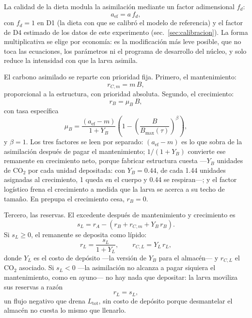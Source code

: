La calidad de la dieta modula la asimilación mediante un factor adimensional $f_d$:
\begin{equation}
  a_{\mathrm{ef}} = a\,f_d,
  \label{eq:aef}
\end{equation}
con $f_d = 1$ en D1 (la dieta con que se calibró el modelo de referencia) y el factor de D4 estimado de los datos de este experimento (sec.~\ref{sec:calibracion}). La forma multiplicativa se elige por economía: es la modificación más leve posible, que no toca las ecuaciones, los parámetros ni el programa de desarrollo del núcleo, y solo reduce la intensidad con que la larva asimila.

El carbono asimilado se reparte con prioridad fija. Primero, el mantenimiento:
\begin{equation}
  r_{C,m} = m\,B,
  \label{eq:mant}
\end{equation}
proporcional a la estructura, con prioridad absoluta. Segundo, el crecimiento:
\begin{equation}
  r_B = \mu_B\,B,
  \label{eq:crec}
\end{equation}
con tasa específica
\begin{equation}
  \mu_B = \frac{(a_{\mathrm{ef}} - m)}{1 + Y_B}\left(1 - \left(\frac{B}{B_{\max}(\tau)}\right)^{\beta}\right),
  \label{eq:muB}
\end{equation}
y $\beta = 1$. Los tres factores se leen por separado: $(a_{\mathrm{ef}} - m)$ es lo que sobra de la asimilación después de pagar el mantenimiento; $1/(1 + Y_B)$ convierte ese remanente en crecimiento neto, porque fabricar estructura cuesta ---$Y_B$ unidades de CO$_2$ por cada unidad depositada: con $Y_B = 0.44$, de cada 1.44 unidades asignadas al crecimiento, 1 queda en el cuerpo y 0.44 se respiran---; y el factor logístico frena el crecimiento a medida que la larva se acerca a su techo de tamaño. En prepupa el crecimiento cesa, $r_B = 0$.

Tercero, las reservas. El excedente después de mantenimiento y crecimiento es
\begin{equation}
  s_L = r_A - (r_B + r_{C,m} + Y_B\,r_B).
  \label{eq:excedente}
\end{equation}
Si $s_L \geq 0$, el remanente se deposita como lípido:
\begin{equation}
  r_L = \frac{s_L}{1 + Y_L}, \qquad r_{C,L} = Y_L\,r_L,
  \label{eq:lipidos-pos}
\end{equation}
donde $Y_L$ es el costo de depósito ---la versión de $Y_B$ para el almacén--- y $r_{C,L}$ el CO$_2$ asociado. Si $s_L < 0$ ---la asimilación no alcanza a pagar siquiera el mantenimiento, como en ayuno--- no hay nada que depositar: la larva moviliza sus reservas a razón
\begin{equation}
  r_L = s_L,
  \label{eq:lipidos-neg}
\end{equation}
un flujo negativo que drena $L_{\mathrm{tot}}$, sin costo de depósito porque desmantelar el almacén no cuesta lo mismo que llenarlo.

